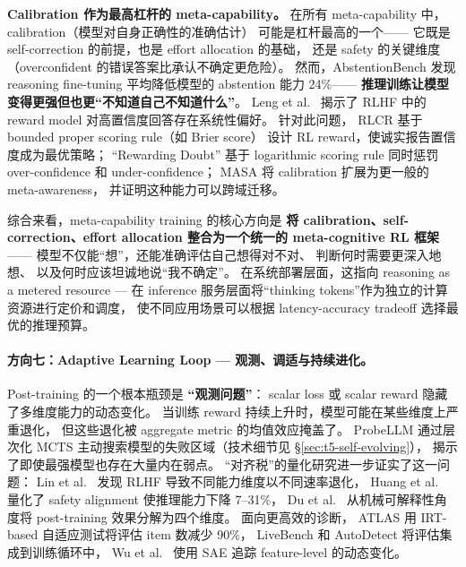 \noindent
\textbf{Calibration 作为最高杠杆的 meta-capability。}
在所有 meta-capability 中，calibration（模型对自身正确性的准确估计）
可能是杠杆最高的一个——
它既是 self-correction 的前提，也是 effort allocation 的基础，
还是 safety 的关键维度（overconfident 的错误答案比承认不确定更危险）。
然而，AbstentionBench \cite{abstentionbench2025} 发现
reasoning fine-tuning 平均降低模型的 abstention 能力 24\%——
\textbf{推理训练让模型变得更强但也更``不知道自己不知道什么''}。
Leng et al.\ \cite{leng2024tamingoverconfidence}
揭示了 RLHF 中的 reward model 对高置信度回答存在系统性偏好。
针对此问题，
RLCR \cite{damani2025rlcr} 基于 bounded proper scoring rule（如 Brier score）
设计 RL reward，使诚实报告置信度成为最优策略；
``Rewarding Doubt'' \cite{stangel2025rewardingdoubt}
基于 logarithmic scoring rule 同时惩罚 over-confidence 和 under-confidence；
MASA \cite{masa2025} 将 calibration 扩展为更一般的 meta-awareness，
并证明这种能力可以跨域迁移。

\noindent
综合来看，meta-capability training 的核心方向是
\textbf{将 calibration、self-correction、effort allocation
整合为一个统一的 meta-cognitive RL 框架}——
模型不仅能``想''，还能准确评估自己想得对不对、
判断何时需要更深入地想、
以及何时应该坦诚地说``我不确定''。
在系统部署层面，这指向
reasoning as a metered resource ---
在 inference 服务层面将``thinking tokens''作为独立的计算资源进行定价和调度，
使不同应用场景可以根据 latency-accuracy tradeoff 选择最优的推理预算。

\paragraph{方向七：Adaptive Learning Loop --- 观测、调适与持续进化。}
Post-training 的一个根本瓶颈是 \textbf{``观测问题''}：
scalar loss 或 scalar reward 隐藏了多维度能力的动态变化。
当训练 reward 持续上升时，模型可能在某些维度上严重退化，
但这些退化被 aggregate metric 的均值效应掩盖了。
ProbeLLM \cite{huang2026probellm} 通过层次化 MCTS
主动搜索模型的失败区域（技术细节见 \S\ref{sec:t5-self-evolving}），
揭示了即使最强模型也存在大量内在弱点。
``对齐税''的量化研究进一步证实了这一问题：
Lin et al.\ \cite{lin2024alignmenttax} 发现 RLHF 导致不同能力维度以不同速率退化，
Huang et al.\ \cite{huang2025safetytax} 量化了 safety alignment 使推理能力下降 7--31\%，
Du et al.\ \cite{du2025reshaping}
从机械可解释性角度将 post-training 效果分解为四个维度。
面向更高效的诊断，
ATLAS \cite{li2025atlas} 用 IRT-based 自适应测试将评估 item 数减少 90\%，
LiveBench \cite{white2024livebench} 和 AutoDetect \cite{cheng2024autodetect}
将评估集成到训练循环中，
Wu et al.\ \cite{wu2024featuretracking} 使用 SAE 追踪 feature-level 的动态变化。

